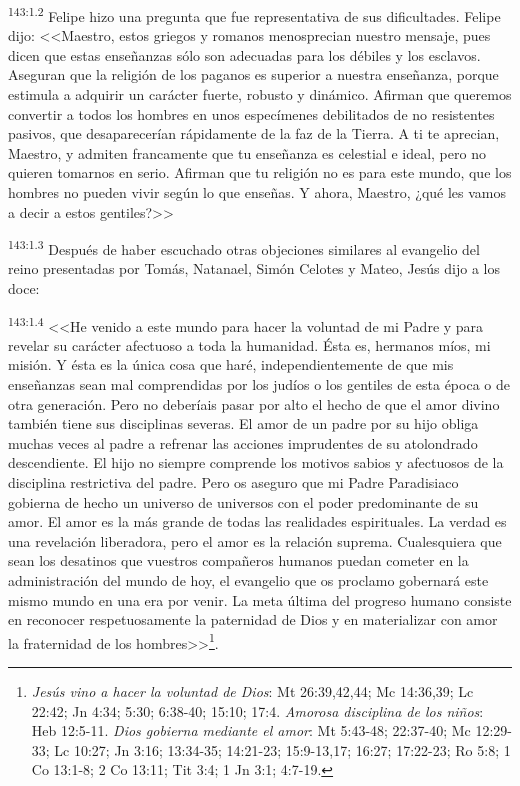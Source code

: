 \par 
\textsuperscript{143:1.2} Felipe hizo una pregunta que fue representativa de sus dificultades. Felipe dijo: <<Maestro, estos griegos y romanos menosprecian nuestro mensaje, pues dicen que estas enseñanzas sólo son adecuadas para los débiles y los esclavos. Aseguran que la religión de los paganos es superior a nuestra enseñanza, porque estimula a adquirir un carácter fuerte, robusto y dinámico. Afirman que queremos convertir a todos los hombres en unos especímenes debilitados de no resistentes pasivos, que desaparecerían rápidamente de la faz de la Tierra. A ti te aprecian, Maestro, y admiten francamente que tu enseñanza es celestial e ideal, pero no quieren tomarnos en serio. Afirman que tu religión no es para este mundo, que los hombres no pueden vivir según lo que enseñas. Y ahora, Maestro, ¿qué les vamos a decir a estos gentiles?>>

\par 
\textsuperscript{143:1.3} Después de haber escuchado otras objeciones similares al evangelio del reino presentadas por Tomás, Natanael, Simón Celotes y Mateo, Jesús dijo a los doce:

\par 
\textsuperscript{143:1.4} <<He venido a este mundo para hacer la voluntad de mi Padre y para revelar su carácter afectuoso a toda la humanidad. Ésta es, hermanos míos, mi misión. Y ésta es la única cosa que haré, independientemente de que mis enseñanzas sean mal comprendidas por los judíos o los gentiles de esta época o de otra generación. Pero no deberíais pasar por alto el hecho de que el amor divino también tiene sus disciplinas severas. El amor de un padre por su hijo obliga muchas veces al padre a refrenar las acciones imprudentes de su atolondrado descendiente. El hijo no siempre comprende los motivos sabios y afectuosos de la disciplina restrictiva del padre. Pero os aseguro que mi Padre Paradisiaco gobierna de hecho un universo de universos con el poder predominante de su amor. El amor es la más grande de todas las realidades espirituales. La verdad es una revelación liberadora, pero el amor es la relación suprema. Cualesquiera que sean los desatinos que vuestros compañeros humanos puedan cometer en la administración del mundo de hoy, el evangelio que os proclamo gobernará este mismo mundo en una era por venir. La meta última del progreso humano consiste en reconocer respetuosamente la paternidad de Dios y en materializar con amor la fraternidad de los hombres>>\footnote{\textit{Jesús vino a hacer la voluntad de Dios}: Mt 26:39,42,44; Mc 14:36,39; Lc 22:42; Jn 4:34; 5:30; 6:38-40; 15:10; 17:4. \textit{Amorosa disciplina de los niños}: Heb 12:5-11. \textit{Dios gobierna mediante el amor}: Mt 5:43-48; 22:37-40; Mc 12:29-33; Lc 10:27; Jn 3:16; 13:34-35; 14:21-23; 15:9-13,17; 16:27; 17:22-23; Ro 5:8; 1 Co 13:1-8; 2 Co 13:11; Tit 3:4; 1 Jn 3:1; 4:7-19.}.

